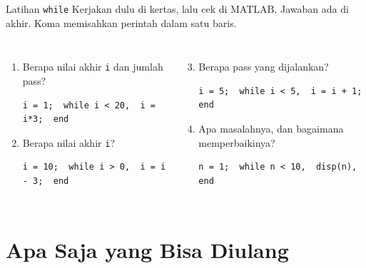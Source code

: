 \documentclass[aspectratio=169,11pt]{beamer}
\begin{document}
\begin{frame}[fragile]{Latihan \texttt{while}}
\small Kerjakan dulu di kertas, lalu cek di MATLAB. Jawaban ada di akhir.
Koma memisahkan perintah dalam satu baris.
\vspace{0.3em}
\begin{columns}[T]
\begin{enumerate}
  \item Berapa nilai akhir \texttt{i} dan jumlah pass?
\begin{lstlisting}[basicstyle=\ttfamily\scriptsize]
i = 1;  while i < 20,  i = i*3;  end
\end{lstlisting}
  \item Berapa nilai akhir \texttt{i}?
\begin{lstlisting}[basicstyle=\ttfamily\scriptsize]
i = 10;  while i > 0,  i = i - 3;  end
\end{lstlisting}
\end{enumerate}
\begin{enumerate}\setcounter{enumi}{2}
  \item Berapa pass yang dijalankan?
\begin{lstlisting}[basicstyle=\ttfamily\scriptsize]
i = 5;  while i < 5,  i = i + 1;  end
\end{lstlisting}
  \item Apa masalahnya, dan bagaimana memperbaikinya?
\begin{lstlisting}[basicstyle=\ttfamily\scriptsize]
n = 1;  while n < 10,  disp(n),  end
\end{lstlisting}
\end{enumerate}
\end{columns}
\end{frame}

\section{Apa Saja yang Bisa Diulang}
\end{document}
